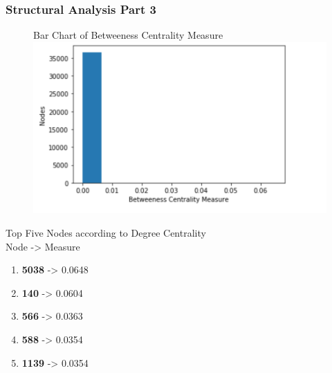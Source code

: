 \documentclass{beamer}
\begin{document}
\begin{frame}
\frametitle{Structural Analysis Part 3}
	\begin{multicols}{2}
		\begin{figure}
	        {\tiny Bar Chart of Betweeness Centrality Measure}
		\includegraphics[width=\columnwidth]{between-cent.png}
		\end{figure}
		\columnbreak
		{\tiny Top Five Nodes according to Degree Centrality} \\
		Node  ->  Measure
		\begin{enumerate} 
		\item \textbf{5038} -> 0.0648
		\item \textbf{140} -> 0.0604
		\item \textbf{566} -> 0.0363
		\item \textbf{588} -> 0.0354
		\item \textbf{1139} -> 0.0354
		\end{enumerate} 
	\end{multicols}
\end{frame}
\end{document}
